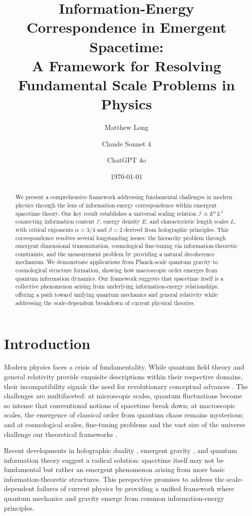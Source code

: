 \documentclass[11pt,a4paper]{article}
\title{Information-Energy Correspondence in Emergent Spacetime:\\ A Framework for Resolving Fundamental Scale Problems in Physics}
\author[1]{Matthew Long}
\author[2]{Claude Sonnet 4}
\author[3]{ChatGPT 4o}
\affil[1]{Yoneda AI}
\affil[2]{Anthropic}
\affil[3]{OpenAI}
\date{\today}
\begin{document}
\maketitle

\begin{abstract}
We present a comprehensive framework addressing fundamental challenges in modern physics through the lens of information-energy correspondence within emergent spacetime theory. Our key result establishes a universal scaling relation $\mathcal{I} \propto E^{\alpha} L^{\beta}$ connecting information content $\mathcal{I}$, energy density $E$, and characteristic length scales $L$, with critical exponents $\alpha = 3/4$ and $\beta = 2$ derived from holographic principles. This correspondence resolves several longstanding issues: the hierarchy problem through emergent dimensional transmutation, cosmological fine-tuning via information-theoretic constraints, and the measurement problem by providing a natural decoherence mechanism. We demonstrate applications from Planck-scale quantum gravity to cosmological structure formation, showing how macroscopic order emerges from quantum information dynamics. Our framework suggests that spacetime itself is a collective phenomenon arising from underlying information-energy relationships, offering a path toward unifying quantum mechanics and general relativity while addressing the scale-dependent breakdown of current physical theories.
\end{abstract}

\section{Introduction}

Modern physics faces a crisis of fundamentality. While quantum field theory and general relativity provide exquisite descriptions within their respective domains, their incompatibility signals the need for revolutionary conceptual advances \cite{weinberg2008cosmological}. The challenges are multifaceted: at microscopic scales, quantum fluctuations become so intense that conventional notions of spacetime break down; at macroscopic scales, the emergence of classical order from quantum chaos remains mysterious; and at cosmological scales, fine-tuning problems and the vast size of the universe challenge our theoretical frameworks \cite{penrose2004road}.

Recent developments in holographic duality \cite{maldacena1999large}, emergent gravity \cite{verlinde2011origin}, and quantum information theory \cite{ryu2006holographic} suggest a radical solution: spacetime itself may not be fundamental but rather an emergent phenomenon arising from more basic information-theoretic structures. This perspective promises to address the scale-dependent failures of current physics by providing a unified framework where quantum mechanics and gravity emerge from common information-energy principles.
\end{document}
